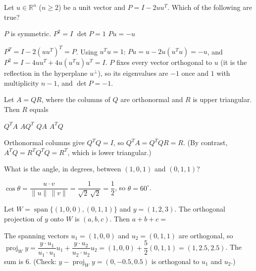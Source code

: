 \begin{question}[id=orth-9, type=msq, marks=2]
Let $u \in \mathbb{R}^n$ ($n \ge 2$) be a unit vector and $P = I - 2uu^T$. Which of the following are true?
\begin{options}
  \correct $P$ is symmetric.
  \correct $P^2 = I$
  \option $\det P = 1$
  \correct $Pu = -u$
\end{options}
\begin{solution}
$P^T = I - 2(uu^T)^T = P$. Using $u^Tu = 1$: $Pu = u - 2u(u^Tu) = -u$, and $P^2 = I - 4uu^T + 4u(u^Tu)u^T = I$. $P$ fixes every vector orthogonal to $u$ (it is the reflection in the hyperplane $u^\perp$), so its eigenvalues are $-1$ once and $1$ with multiplicity $n - 1$, and $\det P = -1$.
\end{solution}
\end{question}

\begin{question}[id=orth-10]
Let $A = QR$, where the columns of $Q$ are orthonormal and $R$ is upper triangular. Then $R$ equals
\begin{options}
  \correct $Q^TA$
  \option $AQ^T$
  \option $QA$
  \option $A^TQ$
\end{options}
\begin{solution}
Orthonormal columns give $Q^TQ = I$, so $Q^TA = Q^TQR = R$. (By contrast, $A^TQ = R^TQ^TQ = R^T$, which is lower triangular.)
\end{solution}
\end{question}

\begin{question}[id=orth-11]
What is the angle, in degrees, between $(1, 0, 1)$ and $(0, 1, 1)$?
\begin{solution}
$\cos\theta = \dfrac{u \cdot v}{\|u\|\,\|v\|} = \dfrac{1}{\sqrt{2}\,\sqrt{2}} = \dfrac{1}{2}$, so $\theta = 60^\circ$.
\end{solution}
\end{question}

\begin{question}[id=orth-12, marks=2]
Let $W = \operatorname{span}\{(1, 0, 0), (0, 1, 1)\}$ and $y = (1, 2, 3)$. The orthogonal projection of $y$ onto $W$ is $(a, b, c)$. Then $a + b + c =$
\begin{solution}
The spanning vectors $u_1 = (1, 0, 0)$ and $u_2 = (0, 1, 1)$ are orthogonal, so $\operatorname{proj}_W y = \dfrac{y \cdot u_1}{u_1 \cdot u_1}u_1 + \dfrac{y \cdot u_2}{u_2 \cdot u_2}u_2 = (1, 0, 0) + \dfrac{5}{2}(0, 1, 1) = (1, 2.5, 2.5)$. The sum is 6. (Check: $y - \operatorname{proj}_W y = (0, -0.5, 0.5)$ is orthogonal to $u_1$ and $u_2$.)
\end{solution}
\end{question}

